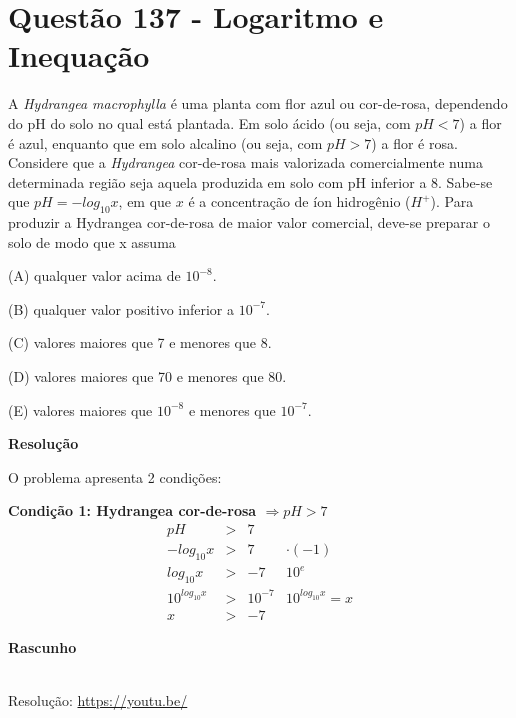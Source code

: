 \section{Questão 137 - Logaritmo e Inequação}

A \textit{Hydrangea macrophylla} é uma planta com flor azul ou cor-de-rosa, dependendo do pH do solo no qual está plantada. Em solo ácido (ou seja, com $ pH < 7 $) a flor é azul, enquanto que em solo alcalino (ou seja, com $ pH > 7 $) a flor é rosa. Considere que a \textit{Hydrangea} cor-de-rosa mais valorizada comercialmente numa determinada região seja aquela produzida em solo com pH inferior a 8. 
Sabe-se que $ pH = - log_{10} x $, em que $ x $ é a concentração de íon hidrogênio ($ H^+ $).
Para produzir a Hydrangea cor-de-rosa de maior valor comercial, deve-se preparar o solo de modo que x assuma

\noindent (A) qualquer valor acima de $ 10^{-8} $.

\noindent (B) qualquer valor positivo inferior a $ 10^{-7} $.

\noindent (C) valores maiores que 7 e menores que 8.

\noindent (D) valores maiores que 70 e menores que 80.

\noindent (E) valores maiores que $ 10^{-8} $ e menores que $ 10^{-7} $.


\textbf{Resolução}

O problema apresenta 2 condições:

\textbf{Condição 1: Hydrangea cor-de-rosa $ \Rightarrow pH > 7 $ }
\begin{align*}
            pH &>& 7        &  \\
    -log_{10}x &>& 7        & \cdot (-1) \\
     log_{10}x &>& -7       & 10^e  \\
10^{log_{10}x} &>& 10^{-7}  & 10^{log_{10}x} = x\\
            x  &>& -7       & 
\end{align*}

\textbf{Rascunho}

\quad


\begin{center}
    \href{https://youtu.be/}{
    }\\
    Resolução: \url{https://youtu.be/}
\end{center}

